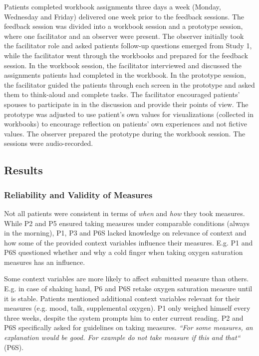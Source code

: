 Patients completed workbook assignments three days a week (Monday, Wednesday and Friday) delivered one week prior to the feedback sessions. The feedback session was divided into a workbook session and a prototype session, where one facilitator and an observer were present. The observer initially took the facilitator role and asked patients follow-up questions emerged from Study 1, while the facilitator went through the workbooks and prepared for the feedback session. In the workbook session, the facilitator interviewed and discussed the assignments patients had completed in the workbook. In the prototype session, the facilitator guided the patients through each screen in the prototype and asked them to think-aloud and complete tasks. The facilitator encouraged patients’ spouses to participate in in the discussion and provide their points of view. The prototype was adjusted to use patient’s own values for visualizations (collected in workbooks) to encourage reflection on patients’ own experiences and not fictive values. The observer prepared the prototype during the workbook session. The sessions were audio-recorded. 

\subsection{Results}     

\subsubsection{Reliability and Validity of Measures}
Not all patients were consistent in terms of \textit{when} and \textit{how} they took measures. While P2 and P5 ensured taking measures under comparable conditions (always in the morning), P1, P3 and P6S lacked knowledge on relevance of context and how some of the provided context variables influence their measures. E.g. P1 and P6S questioned whether and why a cold finger when taking oxygen saturation measures has an influence. 

Some context variables are more likely to affect submitted measure than others. E.g. in case of shaking hand, P6 and P6S retake oxygen saturation measure until it is stable. Patients mentioned additional context variables relevant for their measures (e.g. mood, talk, supplemental oxygen). P1 only weighed himself every three weeks, despite the system prompts him to enter current reading. P2 and P6S specifically asked for guidelines on taking measures. \textit{“For some measures, an explanation would be good. For example do not take measure if this and that“} (P6S). 

